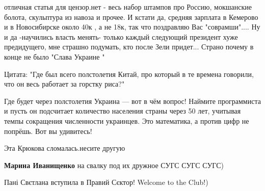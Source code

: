 \begin{itemize}
 

отличная статья для цензор.нет - весь набор штампов про Россию, мокшанские
болота, скульптура из навоза и прочее. И кстати да, средняя зарплата в Кемерово
и в Новосибирске около 40к , а не 18к, так что поздравляю Вас "соврамши".... Ну
и да -научились власть менять- только каждый следующий президент хуже
предидущего, мне страшно подумать, кто после Зели придет... Страно почему в
конце не было "Слава Украине "

 

Цитата: "Где был всего полстолетия Китай, про который в те времена говорили,
что он весь работает за горстку риса?"

Где будет через полстолетия Украина — вот в чём вопрос! Наймите программиста и
пусть он подсчитает количество населения страны через 50 лет, учитывая темпы
сокращения численности украинцев. Это математика, а против цифр не попрёшь. Вот
вы удивитесь!

 
Эта Крюкова сломалась.несите другую

\begin{itemize}
 
\textbf{Марина Иванищенко} на свалку под их дружное СУГС СУГС СУГС)
\end{itemize}

 

Пані Свєтлана вступила в Правий Сєктор! Welcome to the Club!)


\end{itemize}
